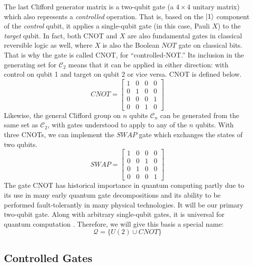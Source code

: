 The last Clifford generator matrix is a two-qubit gate (a $4 \times 4$ unitary matrix) which
also represents a \emph{controlled} operation. That is, based on the
$\left\vert{1}\right\rangle$ component of the \emph{control} qubit, it applies a single-qubit
gate (in this case, Pauli $X$) to the \emph{target} qubit.
In fact,
both CNOT and $X$ are also fundamental gates in classical reversible
logic as well, where $X$ is also the Boolean $NOT$ gate on classical bits.
That is why the gate is called CNOT, for ``controlled-NOT.'' Its inclusion
in the generating set for $\mathcal{C}_2$ means that it can be applied
in either direction: with control on qubit 1 and target on qubit 2 or
vice versa. CNOT is defined below.
%
\begin{equation}
CNOT = 
 \left[
  \begin{array}{cccc}
    1 & 0 & 0 & 0 \\
    0 & 1 & 0 & 0 \\
    0 & 0 & 0 & 1 \\
    0 & 0 & 1 & 0
  \end{array} \right]
\end{equation}
%
Likewise, the general Clifford group on $n$ qubits $\mathcal{C}_n$
can be generated from the same set
as $\mathcal{C}_2$, with gates understood to apply to any of the $n$ qubits.
With three CNOTs, we can implement the $SWAP$ gate which exchanges the
states of two qubits.
%
\begin{equation}
SWAP = 
 \left[
  \begin{array}{cccc}
    1 & 0 & 0 & 0 \\
    0 & 0 & 1 & 0 \\
    0 & 1 & 0 & 0 \\
    0 & 0 & 0 & 1
  \end{array} \right]
\end{equation}
%
The gate CNOT has historical importance in quantum computing partly
due to its use in many
early quantum gate decompositions and its ability to
be performed fault-tolerantly in many physical technologies. It will be our
primary two-qubit gate.
Along with arbitrary single-qubit gates, it is universal for quantum computation \cite{Barenco1995a}.
Therefore, we will give this basis a special name:
%
\begin{equation}
\mathcal{Q} = \{ U(2) \cup CNOT \}
\end{equation}

\subsection{Controlled Gates}
\label{subsec:controlled}

